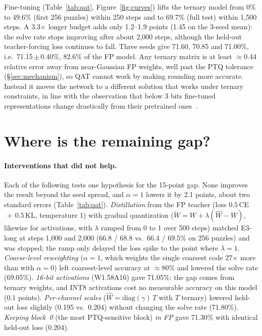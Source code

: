 \documentclass[11pt]{article}
\begin{document}
Fine-tuning (Table~\ref{tab:qat}, Figure~\ref{fig:curves}) lifts the ternary model from 0\% to 49.6\% (first 256
puzzles) within 250 steps and to 69.7\% (full test) within 1,500 steps. A 3.3$\times$ longer budget adds only
1.2--1.9 points (1.45 on the 3-seed mean): the solve rate stops improving after about 2,000 steps, although the
held-out teacher-forcing loss continues to fall. Three seeds give 71.60, 70.85 and 71.00\%, i.e.\
71.15\,$\pm$\,0.40\%, 82.6\% of the FP model. Any ternary matrix is at least $\approx$0.44 relative error away
from near-Gaussian FP weights, well past the PTQ tolerance (\S\ref{sec:mechanism}), so QAT cannot work by making
rounding more accurate. Instead it moves the network to a different solution that works under ternary
constraints, in line with the observation that below 3 bits fine-tuned representations change drastically from
their pretrained ones~\citep{liu2025paretoq}.

\section{Where is the remaining gap?}
\label{sec:gap}

\paragraph{Interventions that did not help.}
Each of the following tests one hypothesis for the 15-point gap. None improves the result beyond the seed spread,
and $\alpha=1$ lowers it by 2.1 points, about two standard errors (Table~\ref{tab:qat}).
\emph{Distillation} from the FP teacher (loss $0.5\,$CE$\,+\,0.5\,$KL, temperature 1) with gradual quantization ($\widetilde W=W+\lambda(\widehat W-W)$, likewise
for activations, with $\lambda$ ramped from 0 to 1 over 500 steps) matched E3-long at steps 1,000 and 2,000
(66.8 / 68.8 vs.\ 66.4 / 69.5\% on 256 puzzles) and was stopped; the ramp only delayed the loss spike to the
point where $\lambda=1$.
\emph{Coarse-level reweighting} ($\alpha=1$, which weights the single coarsest code 27$\times$ more than with
$\alpha=0$) left coarsest-level accuracy at $\approx$80\% and lowered the solve rate (69.05\%).
\emph{16-bit activations} (W1.58A16) gave 71.05\%: the gap comes from ternary weights, and INT8 activations cost
no measurable accuracy on this model (0.1 points).
\emph{Per-channel scales} ($\widehat W=\mathrm{diag}(\gamma)\,T$ with $T$ ternary) lowered held-out loss slightly
(0.195 vs.\ 0.204) without changing the solve rate (71.80\%).
\emph{Keeping block~0} (the most PTQ-sensitive block) \emph{in FP} gave 71.30\% with identical held-out loss
(0.204).
\end{document}
